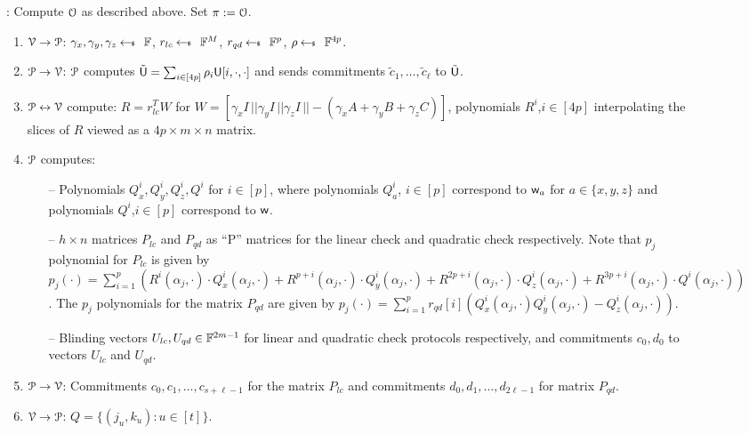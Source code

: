 \begin{figure}[h!]
{\begin{framed}
			: Compute $\comoracle$ as described above. Set $\pi := \comoracle$.
			\begin{enumerate}[{\rm 1.}]
				\item $\verifier\rightarrow\prover$: $\gamma_x,\gamma_y,\gamma_z\sample \FF$, $r_{lc}\sample \FF^M$, $r_{qd}\sample \FF^{p}$, $\rho\sample \FF^{4p}$.
				\item $\prover\rightarrow\verifier$: $\prover$ computes $\tilde{\ewit}=\sum_{i\in [4p]}\rho_i\ewit[i,\cdot,\cdot]$ and sends commitments $\tilde{c}_1, \ldots, \tilde{c}_\ell$ to $\tilde{\ewit}$.
				\item $\prover\leftrightarrow\verifier$ compute: $R=r_{lc}^TW$ for $W=[\gamma_xI\,||\gamma_yI\,||\gamma_zI\,||-(\gamma_xA+\gamma_yB+\gamma_zC)]$, polynomials $R^i$,$i\in [4p]$ interpolating the slices of $R$ viewed as a $4p\times m\times n$ matrix.
				\item $\prover$ computes:
				\begin{itemize}
					\item[--] Polynomials $Q^i_x,Q^i_y,Q^i_z,Q^i$ for $i\in [p]$, where polynomials $Q^i_a$, $i\in [p]$ correspond to $\wit_a$ for $a\in \{x,y,z\}$ and	polynomials $Q^i$,$i\in [p]$ correspond to $\wit$.
					\item[--] $h\times n$ matrices $P_{lc}$ and $P_{qd}$ as ``P'' matrices for the linear check and quadratic check respectively. Note that $p_j$ polynomial for $P_{lc}$ is given by $p_j(\cdot) = \sum_{i=1}^p (R^i(\alpha_j,\cdot) \cdot Q_x^i(\alpha_j,\cdot) + R^{p+i}(\alpha_j,\cdot)\cdot Q^i_y(\alpha_j,\cdot) + R^{2p+i}(\alpha_j,\cdot) \cdot Q^i_z(\alpha_j,\cdot) + R^{3p+i}(\alpha_j,\cdot) \cdot Q^i(\alpha_j,\cdot))$. The $p_j$ polynomials for the matrix $P_{qd}$ are given by $p_j(\cdot)=\sum_{i=1}^{p}r_{qd}[i](Q^i_x(\alpha_j,\cdot)Q^i_y(\alpha_j,\cdot)-Q^i_z(\alpha_j,\cdot))$.
					\item[--] Blinding vectors $U_{lc},U_{qd}\in \FF^{2m-1}$ for linear and quadratic check protocols respectively, and commitments $c_0,d_0$ to vectors $U_{lc}$
					and $U_{qd}$.
				\end{itemize}
				\item $\prover\rightarrow\verifier$: Commitments $c_0,c_1,\ldots,c_{s+\ell-1}$ for the matrix $P_{lc}$ and commitments $d_0,d_1,\ldots,d_{2\ell-1}$ for matrix $P_{qd}$.
				\item $\verifier\rightarrow\prover$: $Q=\{(j_u,k_u):u\in [t]\}$.

\end{enumerate}
\end{framed}}
\end{figure}
